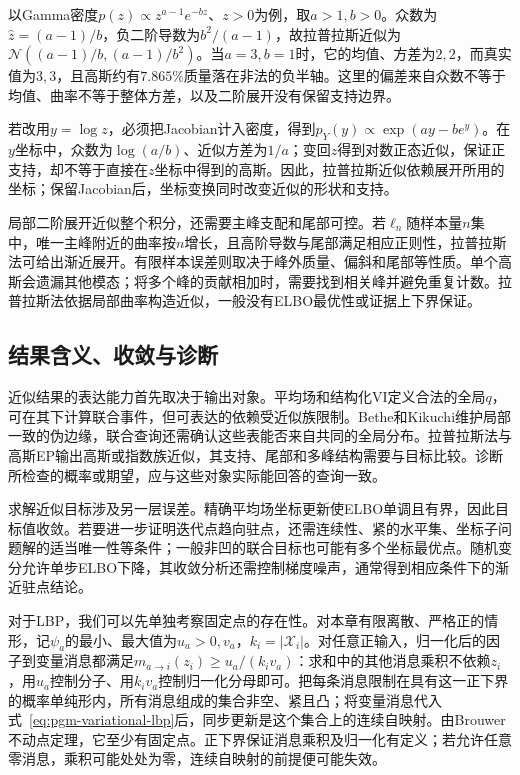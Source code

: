 以Gamma密度$p(z)\propto z^{a-1}e^{-bz}$、$z>0$为例，取$a>1,b>0$。众数为$\widehat z=(a-1)/b$，负二阶导数为$b^2/(a-1)$，故拉普拉斯近似为$\mathcal N((a-1)/b,(a-1)/b^2)$。当$a=3,b=1$时，它的均值、方差为$2,2$，而真实值为$3,3$，且高斯约有$7.865\%$质量落在非法的负半轴。这里的偏差来自众数不等于均值、曲率不等于整体方差，以及二阶展开没有保留支持边界。

若改用$y=\log z$，必须把Jacobian计入密度，得到$p_Y(y)\propto\exp(ay-be^y)$。在$y$坐标中，众数为$\log(a/b)$、近似方差为$1/a$；变回$z$得到对数正态近似，保证正支持，却不等于直接在$z$坐标中得到的高斯。因此，拉普拉斯近似依赖展开所用的坐标；保留Jacobian后，坐标变换同时改变近似的形状和支持。

局部二阶展开近似整个积分，还需要主峰支配和尾部可控。若$\ell_n$随样本量$n$集中，唯一主峰附近的曲率按$n$增长，且高阶导数与尾部满足相应正则性，拉普拉斯法可给出渐近展开。有限样本误差则取决于峰外质量、偏斜和尾部等性质。单个高斯会遗漏其他模态；将多个峰的贡献相加时，需要找到相关峰并避免重复计数。拉普拉斯法依据局部曲率构造近似，一般没有ELBO最优性或证据上下界保证。

\subsection{结果含义、收敛与诊断}
\label{sec:pgm-variational-results-diagnostics}
\label{sec:pgm-variational-analysis}
\label{sec:pgm-variational-convergence}
\label{sec:pgm-variational-complexity}
\label{sec:pgm-variational-diagnostics}

近似结果的表达能力首先取决于输出对象。平均场和结构化VI定义合法的全局$q$，可在其下计算联合事件，但可表达的依赖受近似族限制。Bethe和Kikuchi维护局部一致的伪边缘，联合查询还需确认这些表能否来自共同的全局分布。拉普拉斯法与高斯EP输出高斯或指数族近似，其支持、尾部和多峰结构需要与目标比较。诊断所检查的概率或期望，应与这些对象实际能回答的查询一致。

求解近似目标涉及另一层误差。精确平均场坐标更新使ELBO单调且有界，因此目标值收敛。若要进一步证明迭代点趋向驻点，还需连续性、紧的水平集、坐标子问题解的适当唯一性等条件；一般非凹的联合目标也可能有多个坐标最优点。随机变分允许单步ELBO下降，其收敛分析还需控制梯度噪声，通常得到相应条件下的渐近驻点结论。

对于LBP，我们可以先单独考察固定点的存在性。对本章有限离散、严格正的情形，记$\psi_a$的最小、最大值为$u_a>0,v_a$，$k_i=|\mathcal X_i|$。对任意正输入，归一化后的因子到变量消息都满足$m_{a\to i}(z_i)\geq u_a/(k_iv_a)$：求和中的其他消息乘积不依赖$z_i$，用$u_a$控制分子、用$k_iv_a$控制归一化分母即可。把每条消息限制在具有这一正下界的概率单纯形内，所有消息组成的集合非空、紧且凸；将变量消息代入式~\eqref{eq:pgm-variational-lbp}后，同步更新是这个集合上的连续自映射。由Brouwer不动点定理，它至少有固定点。正下界保证消息乘积及归一化有定义；若允许任意零消息，乘积可能处处为零，连续自映射的前提便可能失效。

